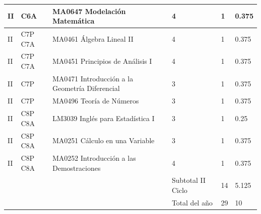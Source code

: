 \begin{longtable}[c]{|p{0.7cm}|p{1.6cm}|p{6.4cm}|p{1.5cm}|p{1.2cm}|p{1.4cm}|}
II & C6A & MA0647 Modelación Matemática & 4 & 1 & 0.375 \\ \hline
II & C7P C7A & MA0461 Álgebra Lineal II & 4 & 1 & 0.375 \\ \hline
II & C7P C7A & MA0451 Principios de Análisis I & 4 & 1 & 0.375 \\ \hline
II & C7P & MA0471 Introducción a la Geometría Diferencial & 3 & 1 & 0.375 \\ \hline
II & C7P & MA0496 Teoría de Números & 3 & 1 & 0.375 \\ \hline
II & C8P C8A & LM3039 Inglés para Estadística I & 3 & 1 & 0.25 \\ \hline
II & C8P C8A & MA0251 Cálculo en una Variable & 3 & 1 & 0.375 \\ \hline
II & C8P C8A & MA0252 Introducción a las Demostraciones & 4 & 1 & 0.375 \\ \hline
 &  &  & Subtotal II Ciclo & 14 & 5.125 \\ \hline
 &  &  & Total del año & 29 & 10 \\ \hline
\end{longtable}

